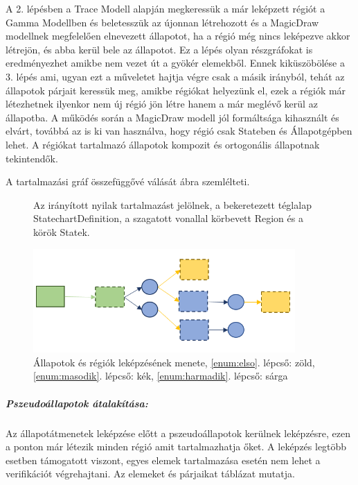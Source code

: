 A 2. lépésben a Trace Modell alapján megkeressük a már leképzett régiót a Gamma Modellben és beletesszük az újonnan létrehozott és a MagicDraw modellnek megfelelően elnevezett állapotot, ha a régió még nincs leképezve akkor létrejön, és abba kerül bele az állapotot. Ez a lépés olyan részgráfokat is eredményezhet amikbe nem vezet út a gyökér elemekből. Ennek kiküszöbölése a 3. lépés ami, ugyan ezt a műveletet hajtja végre csak a másik irányból, tehát az állapotok párjait keressük meg, amikbe régiókat helyezünk el, ezek a régiók már létezhetnek ilyenkor nem új régió jön létre hanem a már meglévő kerül az állapotba. A működés során a MagicDraw modell jól formáltsága kihasznált és elvárt, továbbá az is ki van használva, hogy régió csak Stateben és Állapotgépben lehet. A régiókat tartalmazó állapotok kompozit és ortogonális állapotnak tekintendők.

A tartalmazási gráf összefüggővé válását  ábra szemlélteti.

\begin{figure}[!h]
Az irányított nyilak tartalmazást jelölnek, a bekeretezett téglalap StatechartDefinition, a szagatott vonallal körbevett Region és a körök Statek.

\centering
\includegraphics[keepaspectratio, width=100mm]{figures/transformation.png}
\caption{Állapotok és régiók leképzésének menete, \ref{enum:elso}. lépcső: zöld, \ref{enum:masodik}. lépcső: kék, \ref{enum:harmadik}. lépcső: sárga}
\label{fig:state-transformation}
\end{figure}


\subparagraph{Pszeudoállapotok átalakítása:}
Az állapotátmenetek leképzése előtt a pszeudoállapotok kerülnek leképzésre, ezen a ponton már létezik minden régió amit tartalmazhatja őket. A leképzés legtöbb esetben támogatott viszont, egyes elemek tartalmazása esetén nem lehet a verifikációt végrehajtani. Az elemeket és párjaikat  táblázat mutatja.

